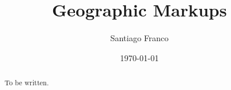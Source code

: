 \documentclass[12pt]{article}
\title{Geographic Markups}  %
\author{Santiago Franco}
\date{\today}
\theoremstyle{definition}
\begin{document}
\maketitle

\begin{abstract}
To be written.
\end{abstract}

\onehalfspacing






\end{document}
